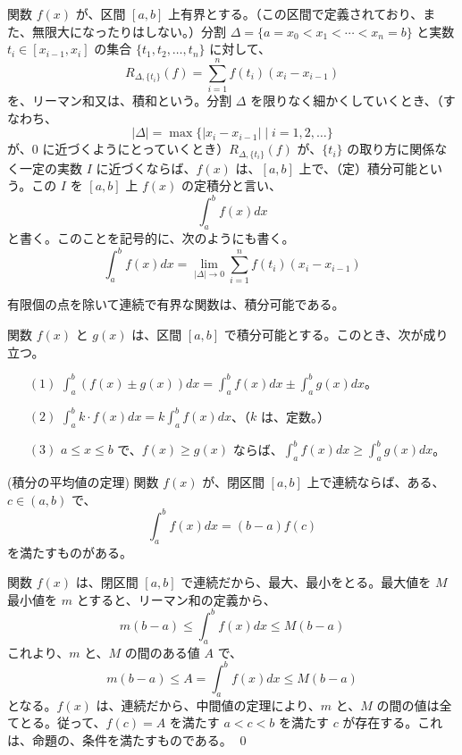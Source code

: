 \newpage{}
\begin{definition}
関数 $f(x)$ が、区間 $[a,b]$ 上有界とする。（この区間で定義されており、また、無限大になったりはしない。）分割 $\Delta = \{a = x_0<x_1<\cdots < x_n = b\}$ と実数 $t_i\in [x_{i-1},x_i]$ の集合 $\{t_1,t_2,\ldots,t_n\}$ に対して、
$$R_{\Delta,\{t_i\}}(f) = \sum_{i=1}^n f(t_i)(x_i-x_{i-1})$$
を、リーマン和又は、積和という。分割 $\Delta$ を限りなく細かくしていくとき、（すなわち、
$$|\Delta| = \max\{|x_i-x_{i-1}|\mid i = 1, 2, \ldots\}$$
 が、$0$ に近づくようにとっていくとき）$R_{\Delta,\{t_i\}}(f)$ が、$\{t_i\}$ の取り方に関係なく一定の実数 $I$ に近づくならば、$f(x)$ は、$[a,b]$ 上で、（定）積分可能という。この $I$ を $[a,b]$ 上 $f(x)$ の定積分と言い、
$$\int_a^b f(x)dx$$
と書く。このことを記号的に、次のようにも書く。
$$\int_a^b f(x)dx = \lim_{|\Delta|\to 0}\sum_{i=1}^n f(t_i)(x_i-x_{i-1})$$
\end{definition}

\begin{prop}
有限個の点を除いて連続で有界な関数は、積分可能である。
\end{prop}

\begin{prop}
関数 $f(x)$ と $g(x)$ は、区間 $[a,b]$ で積分可能とする。このとき、次が成り立つ。
\begin{itemize}
\item[$(1)$] ${\displaystyle \int_a^b (f(x) \pm g(x))dx  = \int_a^b f(x)dx \pm \int_a^b g(x)dx}$。
\item[$(2)$] ${\displaystyle \int_a^b k\cdot f(x)dx = k\int_a^b f(x)dx}$、（$k$ は、定数。）
\item[$(3)$] $a\leq x\leq b$ で、$f(x)\geq g(x)$ ならば、${\displaystyle \int_a^b f(x)dx \geq \int_a^b g(x)dx}$。
\end{itemize}
\end{prop}

\begin{prop} {\rm (積分の平均値の定理)}
関数 $f(x)$ が、閉区間 $[a,b]$ 上で連続ならば、ある、$c\in (a,b)$  で、
$$\int_a^b f(x)dx = (b-a)f(c)$$
を満たすものがある。
\end{prop}
\proof
関数 $f(x)$ は、閉区間 $[a,b]$ で連続だから、最大、最小をとる。最大値を $M$ 最小値を $m$ とすると、リーマン和の定義から、
$$m(b-a) \leq \int_a^b f(x)dx \leq M(b-a)$$
これより、$m$ と、$M$ の間のある値 $A$ で、
$$m(b-a) \leq A = \int_a^b f(x)dx \leq M(b-a)$$
となる。$f(x)$ は、連続だから、中間値の定理により、$m$ と、$M$ の間の値は全てとる。従って、$f(c) = A$ を満たす $a < c < b$ を満たす $c$ が存在する。これは、命題の、条件を満たすものである。
\qed

